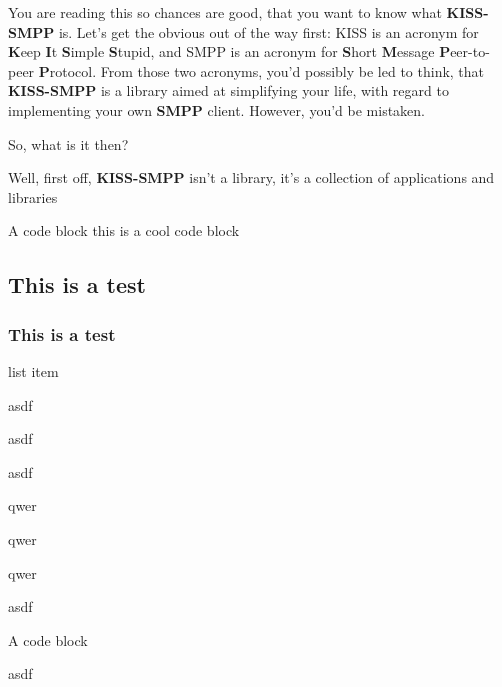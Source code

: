 You are reading this so chances are good, that you want to know what {\bfseries K\-I\-S\-S-\/\-S\-M\-P\-P} is. Let's get the obvious out of the way first\-: K\-I\-S\-S is an acronym for {\bfseries K}eep {\bfseries I}t {\bfseries S}imple {\bfseries S}tupid, and S\-M\-P\-P is an acronym for {\bfseries S}hort {\bfseries M}essage {\bfseries P}eer-\/to-\/peer {\bfseries P}rotocol. From those two acronyms, you'd possibly be led to think, that {\bfseries K\-I\-S\-S-\/\-S\-M\-P\-P} is a library aimed at simplifying your life, with regard to implementing your own {\bfseries S\-M\-P\-P} client. However, you'd be mistaken.

So, what is it then?

Well, first off, {\bfseries K\-I\-S\-S-\/\-S\-M\-P\-P} isn't a library, it's a collection of applications and libraries

\begin{DoxyVerb}A code block
this is a cool code block
\end{DoxyVerb}


\subsection*{This is a test}

\subsubsection*{This is a test}


\begin{DoxyEnumerate}
\item list item
\begin{DoxyItemize}
\item asdf
\item asdf
\item asdf
\begin{DoxyItemize}
\item qwer
\item qwer
\item qwer
\end{DoxyItemize}
\item asdf
\end{DoxyItemize}
\end{DoxyEnumerate}

\begin{DoxyVerb}A code block
\end{DoxyVerb}


asdf


